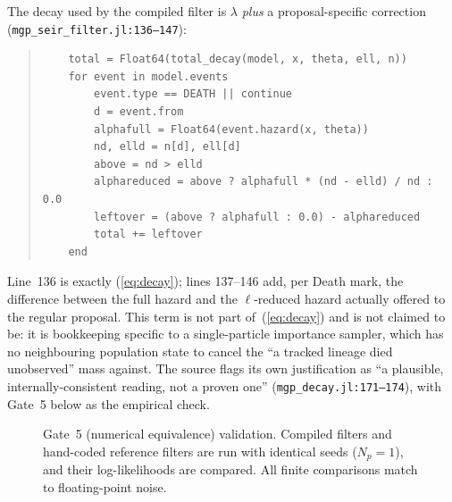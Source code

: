 \documentclass[11pt,leqno]{article}
\newcommand{\lik}{\mathcal{L}}      %
\newcommand{\code}[1]{\texttt{#1}}
\theoremstyle{plain}
\theoremstyle{definition}
\begin{document}
The decay used by the compiled filter is $\lambda$ \emph{plus} a
proposal-specific correction (\code{mgp\_seir\_filter.jl:136--147}):
\begin{quote}
{\small
\begin{verbatim}
    total = Float64(total_decay(model, x, theta, ell, n))
    for event in model.events
        event.type == DEATH || continue
        d = event.from
        alphafull = Float64(event.hazard(x, theta))
        nd, elld = n[d], ell[d]
        above = nd > elld
        alphareduced = above ? alphafull * (nd - elld) / nd : 0.0
        leftover = (above ? alphafull : 0.0) - alphareduced
        total += leftover
    end
\end{verbatim}
}
\end{quote}
Line~136 is exactly (\ref{eq:decay}); lines 137--146 add, per Death mark, the
difference between the full hazard and the $\ell$-reduced hazard actually
offered to the regular proposal.  This term is not part of~(\ref{eq:decay})
and is not claimed to be: it is bookkeeping specific to a single-particle
importance sampler, which has no neighbouring population state to cancel the
``a tracked lineage died unobserved'' mass against.  The source flags its own
justification as ``a plausible, internally-consistent reading, not a proven
one'' (\code{mgp\_decay.jl:171--174}), with Gate~5 below as the empirical
check.

\begin{figure}[ht]
\centering
{}
\caption{Gate~5 (numerical equivalence) validation.  Compiled filters and
hand-coded reference filters are run with identical seeds ($N_p = 1$), and
their log-likelihoods are compared.  All finite comparisons match to
floating-point noise.}
\label{fig:gate5}
\end{figure}
\end{document}
